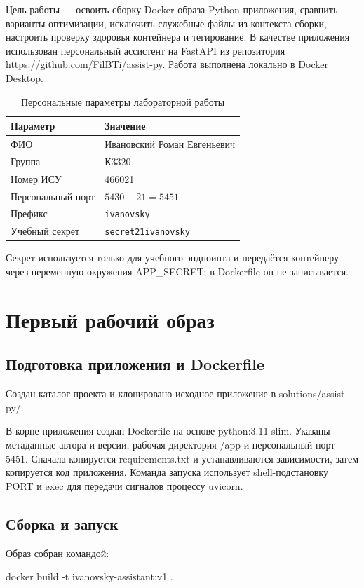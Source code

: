 Цель работы --- освоить сборку Docker-образа Python-приложения, сравнить варианты оптимизации, исключить служебные файлы из контекста сборки, настроить проверку здоровья контейнера и тегирование.
В качестве приложения использован персональный ассистент на FastAPI из репозитория \url{https://github.com/FilBTi/assist-py}. Работа выполнена локально в Docker Desktop.

\begin{table}[H]
\caption{Персональные параметры лабораторной работы}
\begin{tabularx}{\textwidth}{|p{48mm}|X|}
\hline
Параметр & Значение \\\hline
ФИО & Ивановский Роман Евгеньевич \\\hline
Группа & К3320 \\\hline
Номер ИСУ & 466021 \\\hline
Персональный порт & $5430+21=5451$ \\\hline
Префикс & \texttt{ivanovsky} \\\hline
Учебный секрет & \texttt{secret21ivanovsky} \\\hline
\end{tabularx}
\end{table}
Секрет используется только для учебного эндпоинта и передаётся контейнеру через переменную окружения APP\_SECRET; в Dockerfile он не записывается.

\chapter{Первый рабочий образ}
\section{Подготовка приложения и Dockerfile}
Создан каталог проекта и клонировано исходное приложение в solutions/assist-py/.

В корне приложения создан Dockerfile на основе python:3.11-slim. Указаны метаданные автора и версии, рабочая директория /app и персональный порт 5451. Сначала копируется requirements.txt и устанавливаются зависимости, затем копируется код приложения.
Команда запуска использует shell-подстановку PORT и exec для передачи сигналов процессу uvicorn.

\section{Сборка и запуск}
Образ собран командой:
\begin{code}
docker build -t ivanovsky-assistant:v1 .
\end{code}

